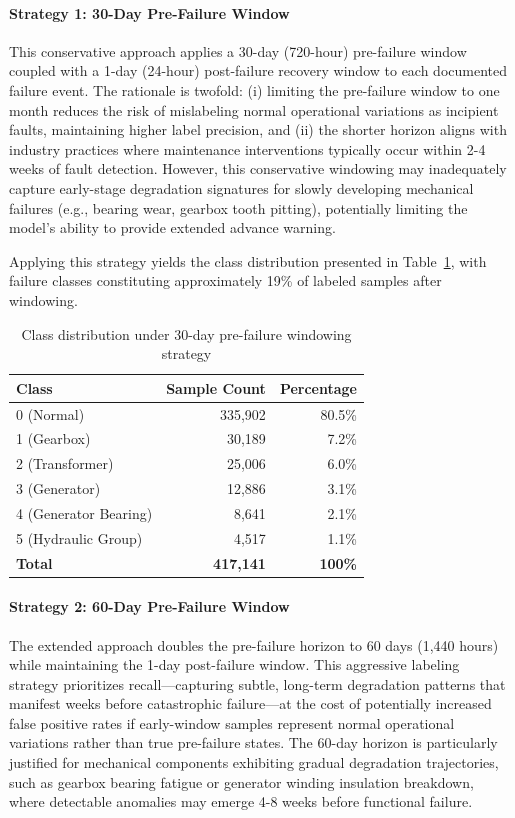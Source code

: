 \documentclass[12pt]{article}
\begin{document}
\paragraph{Strategy 1: 30-Day Pre-Failure Window}
This conservative approach applies a 30-day (720-hour) pre-failure window coupled with a 1-day (24-hour) post-failure recovery window to each documented failure event. The rationale is twofold: (i) limiting the pre-failure window to one month reduces the risk of mislabeling normal operational variations as incipient faults, maintaining higher label precision, and (ii) the shorter horizon aligns with industry practices where maintenance interventions typically occur within 2-4 weeks of fault detection. However, this conservative windowing may inadequately capture early-stage degradation signatures for slowly developing mechanical failures (e.g., bearing wear, gearbox tooth pitting), potentially limiting the model's ability to provide extended advance warning.

Applying this strategy yields the class distribution presented in Table~\ref{tab:class_dist_30d}, with failure classes constituting approximately 19\% of labeled samples after windowing.

\begin{table}[htbp]
\centering
\caption{Class distribution under 30-day pre-failure windowing strategy}
\label{tab:class_dist_30d}
\begin{tabular}{lrr}
\toprule
\textbf{Class} & \textbf{Sample Count} & \textbf{Percentage} \\
\midrule
0 (Normal) & 335,902 & 80.5\% \\
1 (Gearbox) & 30,189 & 7.2\% \\
2 (Transformer) & 25,006 & 6.0\% \\
3 (Generator) & 12,886 & 3.1\% \\
4 (Generator Bearing) & 8,641 & 2.1\% \\
5 (Hydraulic Group) & 4,517 & 1.1\% \\
\midrule
\textbf{Total} & \textbf{417,141} & \textbf{100\%} \\
\bottomrule
\end{tabular}
\end{table}

\paragraph{Strategy 2: 60-Day Pre-Failure Window}
The extended approach doubles the pre-failure horizon to 60 days (1,440 hours) while maintaining the 1-day post-failure window. This aggressive labeling strategy prioritizes recall—capturing subtle, long-term degradation patterns that manifest weeks before catastrophic failure—at the cost of potentially increased false positive rates if early-window samples represent normal operational variations rather than true pre-failure states. The 60-day horizon is particularly justified for mechanical components exhibiting gradual degradation trajectories, such as gearbox bearing fatigue or generator winding insulation breakdown, where detectable anomalies may emerge 4-8 weeks before functional failure.
\end{document}
